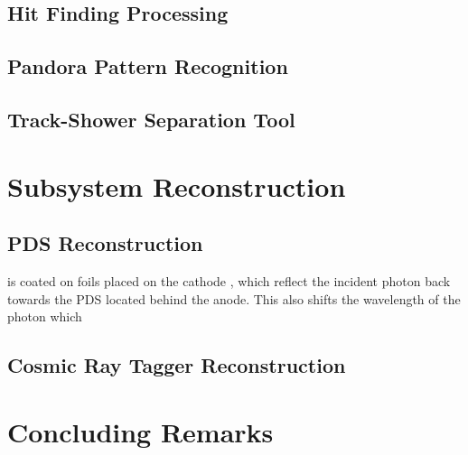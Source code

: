 \subsection{Hit Finding Processing}

\subsection{Pandora Pattern Recognition}

\subsection{Track-Shower Separation Tool}

\section{Subsystem Reconstruction}

\subsection{PDS Reconstruction}
is coated on foils placed on the cathode
, which reflect the incident photon back towards the PDS located behind the anode. 
This also shifts the wavelength of the photon which 


\subsection{Cosmic Ray Tagger Reconstruction}


\section{Concluding Remarks}
